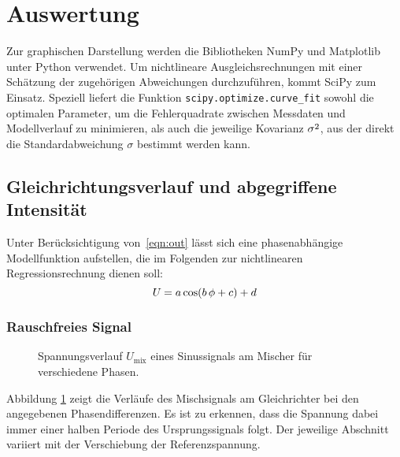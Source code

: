 \vfill

\section{Auswertung}
\label{sec:auswertung}

Zur graphischen Darstellung werden die Bibliotheken NumPy \cite{numpy} und Matplotlib \cite{matplotlib}
unter Python \cite{python} verwendet. Um nichtlineare Ausgleichsrechnungen mit einer Schätzung der
zugehörigen Abweichungen durchzuführen, kommt SciPy \cite{scipy} zum Einsatz. Speziell liefert die Funktion
\verb+scipy.optimize.curve_fit+ sowohl die optimalen Parameter, um die Fehlerquadrate zwischen Messdaten
und Modellverlauf zu minimieren, als auch die jeweilige Kovarianz $\sigma\raisebox{-0.2ex}{\(^2\)}$, aus der
direkt die Standardabweichung $\sigma$ bestimmt werden kann.

\newpage

\subsection{Gleichrichtungsverlauf und abgegriffene Intensität}

Unter Berücksichtigung von~\eqref{eqn:out} lässt sich eine phasenabhängige Modellfunktion
aufstellen, die im Folgenden zur nichtlinearen Regressionsrechnung dienen soll:
\begin{equation}
	U \hspace{-0.1ex} = a \cos(b \, \phi + c) + d
	\label{eqn:fit_1}
\end{equation}
\subsubsection{Rauschfreies Signal}
\begin{figure}
	
	\captionsetup{width=0.975\linewidth}
	\caption{Spannungsverlauf $U_{\! \text{mix}}$ eines Sinussignals am Mischer für verschiedene Phasen.}
	\label{fig:mix_no_noise}
\end{figure}

Abbildung \ref{fig:mix_no_noise} zeigt die Verläufe des Mischsignals am Gleichrichter bei den angegebenen
Phasendifferenzen. Es ist zu erkennen, dass die Spannung dabei immer einer halben Periode des Ursprungssignals
folgt. Der jeweilige Abschnitt variiert mit der Verschiebung der Referenzspannung.

